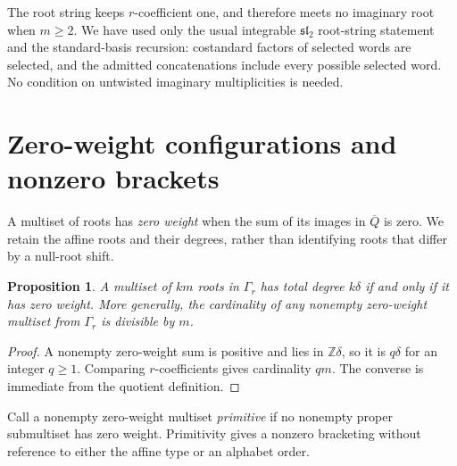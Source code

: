 \documentclass[11pt]{amsart}
\numberwithin{equation}{section}
\newtheorem{proposition}[theorem]{Proposition}
\theoremstyle{definition}
\newcommand{\Z}{\mathbb Z}
\begin{document}
The root string keeps $r$-coefficient one, and therefore meets no imaginary root when $m\geq2$. We have used only the usual integrable $\mathfrak{sl}_2$ root-string statement and the standard-basis recursion: costandard factors of selected words are selected, and the admitted concatenations include every possible selected word. No condition on untwisted imaginary multiplicities is needed.

\section{Zero-weight configurations and nonzero brackets}\label{sec:circuits}

A multiset of roots has \emph{zero weight} when the sum of its images in $\overline Q$ is zero. We retain the affine roots and their degrees, rather than identifying roots that differ by a null-root shift.

\begin{proposition}\label{prop:all-zero-weight}
A multiset of $km$ roots in $\Gamma_r$ has total degree $k\delta$ if and only if it has zero weight. More generally, the cardinality of any nonempty zero-weight multiset from $\Gamma_r$ is divisible by $m$.
\end{proposition}
\begin{proof}
A nonempty zero-weight sum is positive and lies in $\Z\delta$, so it is $q\delta$ for an integer $q\geq1$. Comparing $r$-coefficients gives cardinality $qm$. The converse is immediate from the quotient definition.
\end{proof}

Call a nonempty zero-weight multiset \emph{primitive} if no nonempty proper submultiset has zero weight. Primitivity gives a nonzero bracketing without reference to either the affine type or an alphabet order.
\end{document}
